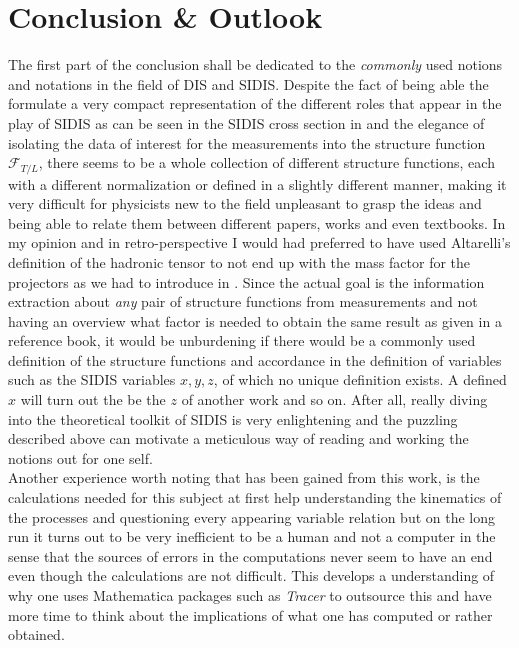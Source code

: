 \chapter{Conclusion \& Outlook}
The first part of the conclusion shall be dedicated to the \emph{commonly} used notions and notations in the field of DIS and SIDIS. Despite the fact of being able the formulate a very compact representation of the different roles that appear in the play of SIDIS as can be seen in the SIDIS cross section in  and the elegance of isolating the data of interest for the measurements into the structure function $\mathcal{F}_{T/L}$, there seems to be a whole collection of different structure functions, each with a different normalization or defined in a slightly different manner, making it very difficult for physicists new to the field unpleasant to grasp the ideas and being able to relate them between different papers, works and even textbooks. In my opinion and in retro-perspective I would had preferred to have used Altarelli's \cite[Eq. (36)]{ALTARELLI1979461} definition of the hadronic tensor to not end up with the mass factor for the projectors as we had to introduce in .  Since the actual goal is the information extraction about \emph{any} pair of structure functions from measurements and not having an overview what factor is needed to obtain the same result as given in a reference book, it would be unburdening if there would be a commonly used definition of the structure functions and accordance in the definition of variables such as the SIDIS variables $x,y,z$, of which no unique definition exists. A defined $x$ will turn out the be the $z$ of another work and so on. After all, really diving into the theoretical toolkit of SIDIS is very enlightening and the puzzling described above can motivate a meticulous way of reading and working the notions out for one self. \\
Another experience worth noting that has been gained from this work, is the calculations needed for this subject at first help understanding the kinematics of the processes and questioning every appearing variable relation but on the long run it turns out to be very inefficient to be a human and not a computer in the sense that the sources of errors in the computations never seem to have an end even though the calculations are not difficult. This develops a understanding of why one uses Mathematica packages such as \emph{Tracer} to outsource this and have more time to think about the implications of what one has computed or rather obtained.\\
